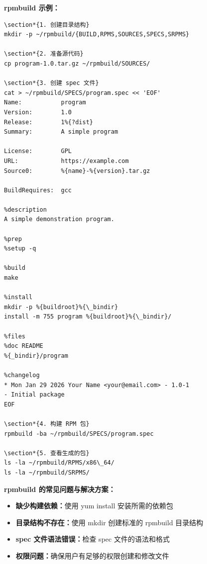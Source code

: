 \documentclass[12pt,UTF8]{ctexbook}
\begin{document}
\textbf{rpmbuild 示例：}
\begin{verbatim}
\section*{1. 创建目录结构}
mkdir -p ~/rpmbuild/{BUILD,RPMS,SOURCES,SPECS,SRPMS}

\section*{2. 准备源代码}
cp program-1.0.tar.gz ~/rpmbuild/SOURCES/

\section*{3. 创建 spec 文件}
cat > ~/rpmbuild/SPECS/program.spec << 'EOF'
Name:           program
Version:        1.0
Release:        1%{?dist}
Summary:        A simple program

License:        GPL
URL:            https://example.com
Source0:        %{name}-%{version}.tar.gz

BuildRequires:  gcc

%description
A simple demonstration program.

%prep
%setup -q

%build
make

%install
mkdir -p %{buildroot}%{\_bindir}
install -m 755 program %{buildroot}%{\_bindir}/

%files
%doc README
%{_bindir}/program

%changelog
* Mon Jan 29 2026 Your Name <your@email.com> - 1.0-1
- Initial package
EOF

\section*{4. 构建 RPM 包}
rpmbuild -ba ~/rpmbuild/SPECS/program.spec

\section*{5. 查看生成的包}
ls -la ~/rpmbuild/RPMS/x86\_64/
ls -la ~/rpmbuild/SRPMS/
\end{verbatim}

\textbf{rpmbuild 的常见问题与解决方案：}
\begin{itemize}
    \item \textbf{缺少构建依赖：}使用 yum install 安装所需的依赖包
    \item \textbf{目录结构不存在：}使用 mkdir 创建标准的 rpmbuild 目录结构
    \item \textbf{spec 文件语法错误：}检查 spec 文件的语法和格式
    \item \textbf{权限问题：}确保用户有足够的权限创建和修改文件
\end{itemize}
\end{document}
